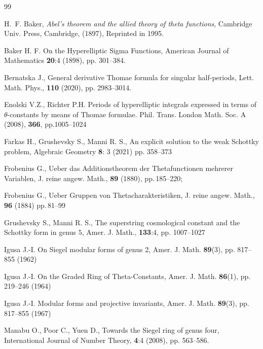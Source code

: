 \documentclass[twoside]{amsart}
\theoremstyle{definition}
\theoremstyle{plain}
\begin{document}
\begin{thebibliography}{99}

H.~F. Baker, \emph{Abel's theorem and the allied theory of theta functions},
  Cambridge Univ. Press, Cambridge, (1897), Reprinted in 1995.
  
Baker H. F. On the Hyperelliptic Sigma Functions, American Journal of Mathematics 
\textbf{20}:4 (1898), pp. 301--384. 
  
 Bernatska J., General derivative Thomae formula for singular half-periods, 
Lett.  Math. Phys., \textbf{110} (2020), pp. 2983--3014.

 Enolski V.Z., Richter P.H. Periods of hyperelliptic integrals expressed in terms of 
$\theta$-constants by means of Thomae formulae. 
Phil. Trans. London Math. Soc. A (2008), \textbf{366}, pp.1005--1024

  Farkas H., Grushevsky S., 
Manni R. S., An explicit solution to the weak Schottky problem,
Algebraic Geometry \textbf{8}: 3 (2021) pp. 358--373


 Frobenius G., Ueber das Additionstheorem der Thetafunctionen mehrerer Variablen,
J. reine angew. Math., \textbf{89} (1880), pp.\,185--220; 

 Frobenius G.,  Ueber Gruppen von Thetacharakteristiken, 
J. reine angew. Math., \textbf{96} (1884) pp.\,81--99

 Grushevsky S., Manni R. S., The superstring cosmological 
constant and the Schottky form in genus $5$, Amer. J. Math., \textbf{133}:4,
pp. 1007--1027

 Igusa J.-I. On Siegel modular forms of genus 2, 
Amer. J. Math. \textbf{89}(3), pp. 817--855 (1962)

 Igusa J.-I. On the Graded Ring of Theta-Constants, 
Amer. J. Math. \textbf{86}(1), pp. 219--246 (1964)

 Igusa J.-I. Modular forms and projective invariants, 
Amer. J. Math. \textbf{89}(3), pp. 817--855 (1967)

 Manabu O., Poor C., Yuen D., Towards the Siegel ring of genus four,
International Journal of Number Theory, \textbf{4}:4 (2008), pp. 563–586.


\end{thebibliography}
\end{document}
